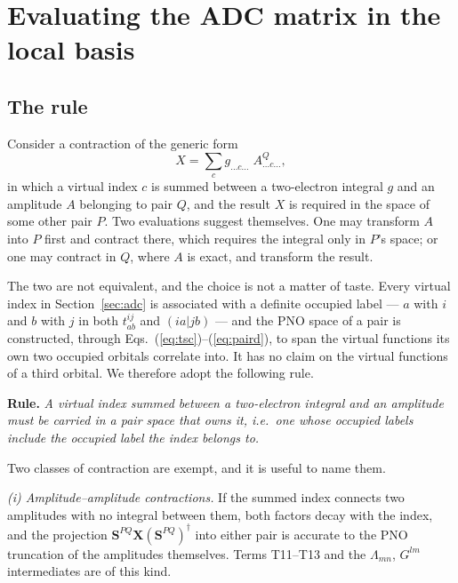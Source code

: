 \documentclass[aip,jcp,amsmath,amssymb,preprint,superscriptaddress]{revtex4-2}%
\begin{document}
\section{Evaluating the ADC matrix in the local basis}
\label{sec:routing}

\subsection{The rule}

Consider a contraction of the generic form
%
\begin{equation}
  X = \sum_{c} g_{\ldots c \ldots}\; A^{Q}_{\ldots c \ldots},
  \label{eq:generic}
\end{equation}
%
in which a virtual index $c$ is summed between a two-electron integral $g$ and
an amplitude $A$ belonging to pair $Q$, and the result $X$ is required in the
space of some other pair $P$. Two evaluations suggest themselves. One may
transform $A$ into $P$ first and contract there, which requires the integral
only in $P$'s space; or one may contract in $Q$, where $A$ is exact, and
transform the result.

The two are not equivalent, and the choice is not a matter of taste. Every
virtual index in Section~\ref{sec:adc} is associated with a definite occupied
label --- $a$ with $i$ and $b$ with $j$ in both $t^{ij}_{ab}$ and $(ia|jb)$ ---
and the PNO space of a pair is constructed, through
Eqs.~(\ref{eq:tsc})--(\ref{eq:paird}), to span the virtual functions its own
two occupied orbitals correlate into. It has no claim on the virtual functions
of a third orbital. We therefore adopt the following rule.

\medskip
\noindent\textbf{Rule.} \emph{A virtual index summed between a two-electron
integral and an amplitude must be carried in a pair space that owns it, i.e.\
one whose occupied labels include the occupied label the index belongs to.}
\medskip

Two classes of contraction are exempt, and it is useful to name them.

\emph{(i) Amplitude--amplitude contractions.} If the summed index connects two
amplitudes with no integral between them, both factors decay with the index,
and the projection $\mathbf{S}^{PQ}\mathbf{X}(\mathbf{S}^{PQ})^{\dagger}$ into
either pair is accurate to the PNO truncation of the amplitudes themselves.
Terms T11--T13 and the $\Lambda_{mn}$, $G^{lm}$ intermediates are of this kind.
\end{document}
